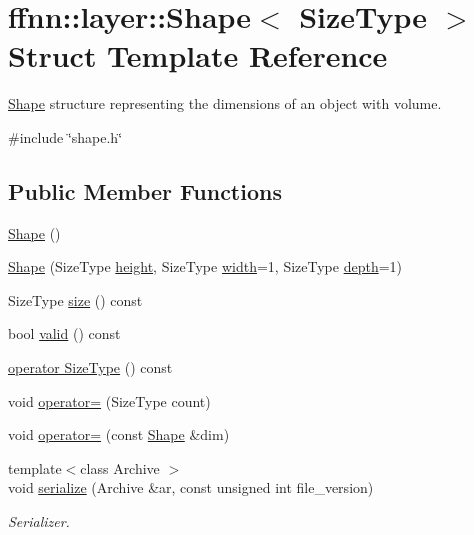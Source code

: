 \hypertarget{structffnn_1_1layer_1_1_shape}{\section{ffnn\-:\-:layer\-:\-:Shape$<$ Size\-Type $>$ Struct Template Reference}
\label{structffnn_1_1layer_1_1_shape}
}


\hyperlink{structffnn_1_1layer_1_1_shape}{Shape} structure representing the dimensions of an object with volume.  




{\ttfamily \#include \char`\"{}shape.\-h\char`\"{}}

\subsection*{Public Member Functions}
\begin{DoxyCompactItemize}
\item 
\hyperlink{structffnn_1_1layer_1_1_shape_a084eabd9eec94244907367aca6d39e4a}{Shape} ()
\item 
\hyperlink{structffnn_1_1layer_1_1_shape_a5beff127a2bb5b14e7d831471623fd48}{Shape} (Size\-Type \hyperlink{structffnn_1_1layer_1_1_shape_a96608d7bcef7733a1b1f4782827a0c78}{height}, Size\-Type \hyperlink{structffnn_1_1layer_1_1_shape_a860cbac53d9e20bdf8283298c6369cbc}{width}=1, Size\-Type \hyperlink{structffnn_1_1layer_1_1_shape_a37ec3deb8c9f2d6617e6f63799c0fcbf}{depth}=1)
\item 
Size\-Type \hyperlink{structffnn_1_1layer_1_1_shape_a6e8ffdbc3feeb20a1f246b3ec56e40ca}{size} () const 
\item 
bool \hyperlink{structffnn_1_1layer_1_1_shape_abef3f2121d2b9f132d02889cd3ceab41}{valid} () const 
\item 
\hyperlink{structffnn_1_1layer_1_1_shape_a10aa9362c85c14aa54e736e497b300ee}{operator Size\-Type} () const 
\item 
void \hyperlink{structffnn_1_1layer_1_1_shape_a649e708cf5a7b2ff9ce7bf855f9d7114}{operator=} (Size\-Type count)
\item 
void \hyperlink{structffnn_1_1layer_1_1_shape_a0835cec02738f5a6cc7b165ce4ec3dc0}{operator=} (const \hyperlink{structffnn_1_1layer_1_1_shape}{Shape} \&dim)
\item 
{\footnotesize template$<$class Archive $>$ }\\void \hyperlink{structffnn_1_1layer_1_1_shape_a53fc6b96338bf4f87d9b2736a40cb172}{serialize} (Archive \&ar, const unsigned int file\-\_\-version)
\begin{DoxyCompactList}\small\item\em Serializer. \end{DoxyCompactList}\end{DoxyCompactItemize}
